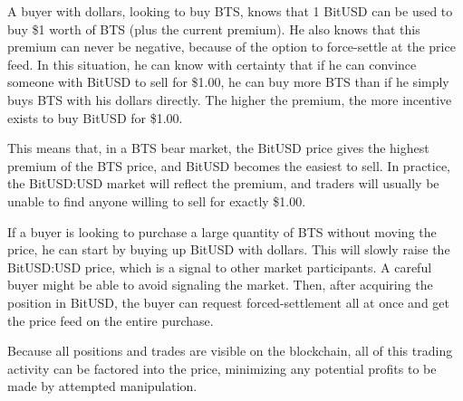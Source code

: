 A buyer with dollars, looking to buy BTS, knows that 1 BitUSD can be used to
buy \$1 worth of BTS (plus the current premium). He also knows that this premium
can never be negative, because of the option to force-settle at the price feed.
In this situation, he can know with certainty that if he can convince someone
with BitUSD to sell for \$1.00, he can buy more BTS than if he simply buys BTS
with his dollars directly. The higher the premium, the more incentive exists to
buy BitUSD for \$1.00.

This means that, in a BTS bear market, the BitUSD price gives the highest
premium of the BTS price, and BitUSD becomes the easiest to sell. In practice,
the BitUSD:USD market will reflect the premium, and traders will usually be
unable to find anyone willing to sell for exactly \$1.00.

If a buyer is looking to purchase a large quantity of BTS without moving the
price, he can start by buying up BitUSD with dollars. This will slowly raise
the BitUSD:USD price, which is a signal to other market participants. A careful
buyer might be able to avoid signaling the market. Then, after acquiring the
position in BitUSD, the buyer can request forced-settlement all at once and get
the price feed on the entire purchase.

Because all positions and trades are visible on the blockchain, all of this
trading activity can be factored into the price, minimizing any potential
profits to be made by attempted manipulation.
